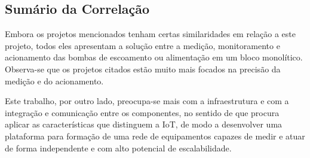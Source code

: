 \subsection{Sumário da Correlação}

Embora os projetos mencionados tenham certas similaridades em relação a este projeto, todos eles apresentam a solução entre a medição, monitoramento e acionamento das bombas de escoamento ou alimentação em um bloco monolítico. Observa-se que os projetos citados estão muito mais focados na precisão da medição e do acionamento.

Este trabalho, por outro lado, preocupa-se mais com a infraestrutura e com a integração e comunicação entre os componentes, no sentido de que procura aplicar as características que distinguem a IoT, de modo a desenvolver uma plataforma para formação de uma rede de equipamentos capazes de medir e atuar de forma independente e com alto potencial de escalabilidade.
